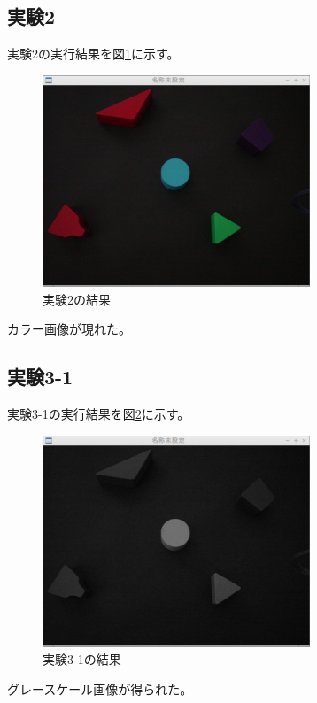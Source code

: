 \documentclass{jarticle}[2012/05/15]
\begin{document}
\subsection{実験2}
実験2の実行結果を図\ref{kadai02}に示す。\par
\begin{figure}[htbp]
  \centering
  \includegraphics[width=8cm]{kadai02.eps}
  \caption{実験2の結果} \label{kadai02}
\end{figure}
カラー画像が現れた。
\pagebreak
\subsection{実験3-1}
実験3-1の実行結果を図\ref{kadai03-1}に示す。\par
\begin{figure}[htbp]
  \centering
  \includegraphics[width=8cm]{kadai03-1.eps}
  \caption{実験3-1の結果} \label{kadai03-1}
\end{figure}
グレースケール画像が得られた。
\pagebreak
\end{document}
